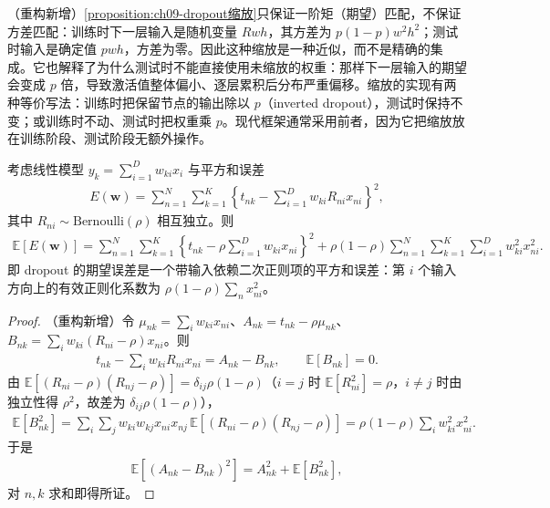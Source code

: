 \documentclass[../../main.tex]{subfiles}
\begin{document}
\begin{remark}（重构新增）\cref{proposition:ch09-dropout缩放}只保证一阶矩（期望）匹配，不保证方差匹配：训练时下一层输入是随机变量 $Rwh$，其方差为 $p(1-p)w^{2}h^{2}$；测试时输入是确定值 $pwh$，方差为零。因此这种缩放是一种近似，而不是精确的集成。它也解释了为什么测试时不能直接使用未缩放的权重：那样下一层输入的期望会变成 $p$ 倍，导致激活值整体偏小、逐层累积后分布严重偏移。缩放的实现有两种等价写法：训练时把保留节点的输出除以 $p$（inverted dropout），测试时保持不变；或训练时不动、测试时把权重乘 $p$。现代框架通常采用前者，因为它把缩放放在训练阶段、测试阶段无额外操作。
\end{remark}

\begin{proposition}\label{proposition:ch09-dropout期望}
考虑线性模型 $y_{k}=\sum_{i=1}^{D}w_{ki}x_{i}$ 与平方和误差
\begin{align*}
E(\boldsymbol{w})=\sum_{n=1}^{N}\sum_{k=1}^{K}\left\{t_{nk}-\sum_{i=1}^{D}w_{ki}R_{ni}x_{ni}\right\}^{2},
\end{align*}
其中 $R_{ni}\sim\mathrm{Bernoulli}(\rho)$ 相互独立。则
\begin{align*}
\mathbb{E}[E(\boldsymbol{w})]
=\sum_{n=1}^{N}\sum_{k=1}^{K}\left\{t_{nk}-\rho\sum_{i=1}^{D}w_{ki}x_{ni}\right\}^{2}
+\rho(1-\rho)\sum_{n=1}^{N}\sum_{k=1}^{K}\sum_{i=1}^{D}w_{ki}^{2}x_{ni}^{2}.
\end{align*}
即 dropout 的期望误差是一个带输入依赖二次正则项的平方和误差：第 $i$ 个输入方向上的有效正则化系数为 $\rho(1-\rho)\sum_{n}x_{ni}^{2}$。
\end{proposition}

\begin{proof}
（重构新增）令 $\mu_{nk}=\sum_{i}w_{ki}x_{ni}$、$A_{nk}=t_{nk}-\rho\mu_{nk}$、$B_{nk}=\sum_{i}w_{ki}(R_{ni}-\rho)x_{ni}$。则
\begin{align*}
t_{nk}-\sum_{i}w_{ki}R_{ni}x_{ni}=A_{nk}-B_{nk},\qquad \mathbb{E}[B_{nk}]=0.
\end{align*}
由 $\mathbb{E}[(R_{ni}-\rho)(R_{nj}-\rho)]=\delta_{ij}\rho(1-\rho)$（$i=j$ 时 $\mathbb{E}[R_{ni}^{2}]=\rho$，$i\neq j$ 时由独立性得 $\rho^{2}$，故差为 $\delta_{ij}\rho(1-\rho)$），
\begin{align*}
\mathbb{E}[B_{nk}^{2}]=\sum_{i}\sum_{j}w_{ki}w_{kj}x_{ni}x_{nj}\,\mathbb{E}[(R_{ni}-\rho)(R_{nj}-\rho)]
=\rho(1-\rho)\sum_{i}w_{ki}^{2}x_{ni}^{2}.
\end{align*}
于是
\begin{align*}
\mathbb{E}\left[(A_{nk}-B_{nk})^{2}\right]=A_{nk}^{2}+\mathbb{E}[B_{nk}^{2}],
\end{align*}
对 $n,k$ 求和即得所证。
\end{proof}
\end{document}

